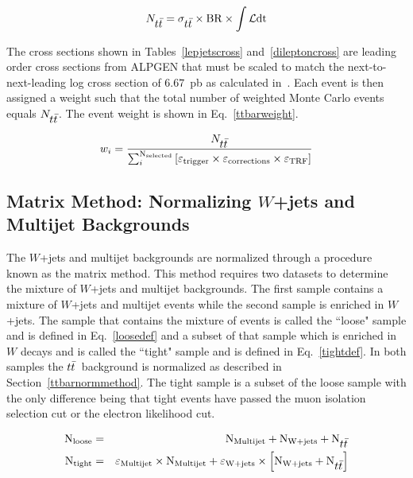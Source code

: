\begin{equation}
\label{ttbarnorm}
N_{\mbox{$t\bar{t}$}} = \sigma_{\mbox{$t\bar{t}$}} \times \rm{BR} \times \int \mathcal{L}\rm{dt}
\end{equation}

The cross sections shown in Tables~\ref{lepjetscross} and~\ref{dileptoncross} are leading order cross sections from ALPGEN that must be scaled to match the next-to-next-leading log cross section of $6.67$~pb as calculated in~\cite{Kidonakis:2003vs,cacciari-2004-0404}. Each event is then assigned a weight such that the total number of weighted Monte Carlo events equals $N_{\mbox{$t\bar{t}$}}$. The event weight is shown in Eq.~\ref{ttbarweight}.

\begin{equation}
\label{ttbarweight}
w_{i} = \frac{N_{\mbox{$t\bar{t}$}}}{\sum_{i}^{\rm{N}_{\rm selected}} \left[ \varepsilon_{\rm trigger} \times
\varepsilon_{\rm corrections} \times \varepsilon_{\rm TRF} \right]}
\end{equation}

\subsection{Matrix Method: Normalizing $W$+jets and Multijet Backgrounds}

The $W$+jets and multijet backgrounds are normalized through a procedure known as the matrix method. This method requires two datasets to determine the mixture of $W$+jets and multijet backgrounds. The first sample contains a mixture of $W$+jets and multijet events while the second sample is enriched in $W$+jets. The sample that contains the mixture of events is called the ``loose" sample and is defined in Eq.~\ref{loosedef} and a subset of that sample which is enriched in $W$ decays and is called the ``tight" sample and is defined in Eq.~\ref{tightdef}. In both samples the $\mbox{$t\bar{t}$}$~background is normalized as described in Section~\ref{ttbarnormmethod}. The tight sample is a subset of the loose sample with the only difference being that tight events have passed the muon isolation selection cut or the electron likelihood cut.

\begin{eqnarray}
\label{loosedef}
\rm{N}_{\rm{loose}} &=& \rm{N}_{\rm{Multijet}} +  \rm{N}_{\rm{W+jets}} + \rm{N}_{\mbox{$t\bar{t}$}}	\\
\label{tightdef}
\rm{N}_{\rm{tight}} &=& \varepsilon_{\rm{Multijet}} \times \rm{N}_{\rm{Multijet}} + \varepsilon_{\rm{W+jets}} \times \left[ \rm{N}_{\rm{W+jets}} + \rm{N}_{\mbox{$t\bar{t}$}} \right]
\end{eqnarray}

